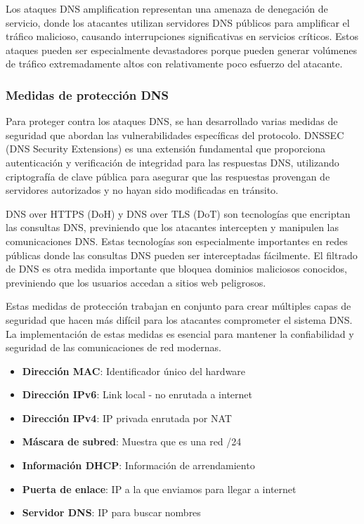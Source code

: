 Los ataques DNS amplification representan una amenaza de denegación de servicio, donde los atacantes utilizan servidores DNS públicos para amplificar el tráfico malicioso, causando interrupciones significativas en servicios críticos. Estos ataques pueden ser especialmente devastadores porque pueden generar volúmenes de tráfico extremadamente altos con relativamente poco esfuerzo del atacante.

\subsubsection{Medidas de protección DNS}

Para proteger contra los ataques DNS, se han desarrollado varias medidas de seguridad que abordan las vulnerabilidades específicas del protocolo. DNSSEC (DNS Security Extensions) es una extensión fundamental que proporciona autenticación y verificación de integridad para las respuestas DNS, utilizando criptografía de clave pública para asegurar que las respuestas provengan de servidores autorizados y no hayan sido modificadas en tránsito.

DNS over HTTPS (DoH) y DNS over TLS (DoT) son tecnologías que encriptan las consultas DNS, previniendo que los atacantes intercepten y manipulen las comunicaciones DNS. Estas tecnologías son especialmente importantes en redes públicas donde las consultas DNS pueden ser interceptadas fácilmente. El filtrado de DNS es otra medida importante que bloquea dominios maliciosos conocidos, previniendo que los usuarios accedan a sitios web peligrosos.

Estas medidas de protección trabajan en conjunto para crear múltiples capas de seguridad que hacen más difícil para los atacantes comprometer el sistema DNS. La implementación de estas medidas es esencial para mantener la confiabilidad y seguridad de las comunicaciones de red modernas.

\begin{itemize}
    \item \textbf{Dirección MAC}: Identificador único del hardware
    \item \textbf{Dirección IPv6}: Link local - no enrutada a internet
    \item \textbf{Dirección IPv4}: IP privada enrutada por NAT
    \item \textbf{Máscara de subred}: Muestra que es una red /24
    \item \textbf{Información DHCP}: Información de arrendamiento
    \item \textbf{Puerta de enlace}: IP a la que enviamos para llegar a internet
    \item \textbf{Servidor DNS}: IP para buscar nombres
\end{itemize}

